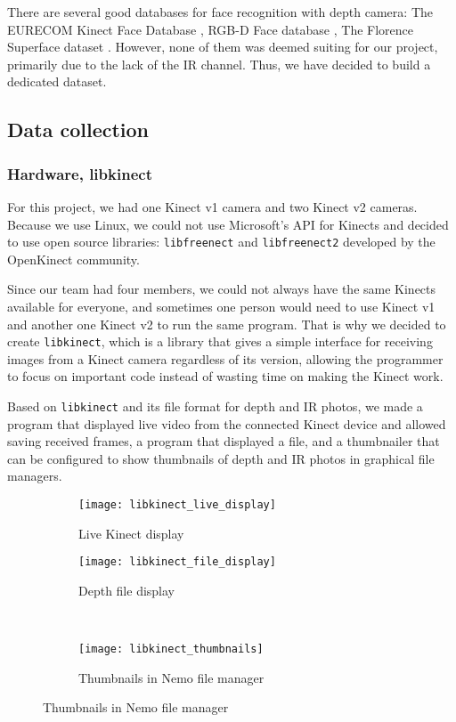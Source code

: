     There are several good databases for face recognition with depth camera:
    The EURECOM Kinect Face Database \cite{eurecom},
    RGB-D Face database \cite{vapaaudk},
    The Florence Superface dataset \cite{superface}. However, none of them was
    deemed suiting for our project, primarily due to the lack of the IR channel.
    Thus, we have decided to build a dedicated dataset.

    \subsection*{Data collection}

    \subsubsection*{Hardware, libkinect}
    For this project, we had one Kinect v1 camera and two Kinect v2 cameras.
    Because we use Linux, we could not use Microsoft's API for Kinects and decided to
    use open source libraries: \texttt{libfreenect} \cite{libfreenect}
    and \texttt{libfreenect2} \cite{libfreenect2} developed by the OpenKinect community.

    Since our team had four members, we could not always have the same Kinects available
    for everyone, and sometimes one person would need to use Kinect v1 and another one
    Kinect v2 to run the same program.
    That is why we decided to create \texttt{libkinect}, which is a library that
    gives a simple interface for receiving images from a Kinect camera
    regardless of its version, allowing the programmer to focus on important code
    instead of wasting time on making the Kinect work.

    Based on \texttt{libkinect} and its file format for depth and IR photos,
    we made a program that displayed live video from the connected Kinect device
    and allowed saving received frames, a program that displayed a file,
    and a thumbnailer that can be configured to show thumbnails of depth and IR photos
    in graphical file managers.

    \begin{figure}[H]
        \centering
        \caption{Screenshots of implemented tools}
        \begin{subfigure}[b]{0.49\textwidth}
            \caption{Live Kinect display}
            \centering
            \texttt{[image: libkinect\_live\_display]}
        \end{subfigure}
        \begin{subfigure}[b]{0.49\textwidth}
            \caption{Depth file display}
            \centering
            \texttt{[image: libkinect\_file\_display]}
        \end{subfigure}\\
        \vspace{3mm}
        \begin{subfigure}[b]{0.6\textwidth}
            \caption{Thumbnails in Nemo file manager}
            \centering
            \texttt{[image: libkinect\_thumbnails]}
        \end{subfigure}
        \label{fig:libkinect_screenshots}
    \end{figure}


